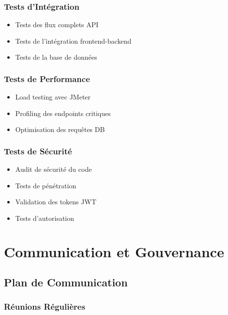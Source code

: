 \documentclass[12pt,a4paper,french]{report}
\begin{document}
\subsection{Tests d'Intégration}

\begin{itemize}
    \item Tests des flux complets API
    \item Tests de l'intégration frontend-backend
    \item Tests de la base de données
\end{itemize}

\subsection{Tests de Performance}

\begin{itemize}
    \item Load testing avec JMeter
    \item Profiling des endpoints critiques
    \item Optimisation des requêtes DB
\end{itemize}

\subsection{Tests de Sécurité}

\begin{itemize}
    \item Audit de sécurité du code
    \item Tests de pénétration
    \item Validation des tokens JWT
    \item Tests d'autorisation
\end{itemize}

\chapter{Communication et Gouvernance}

\section{Plan de Communication}

\subsection{Réunions Régulières}
\end{document}
